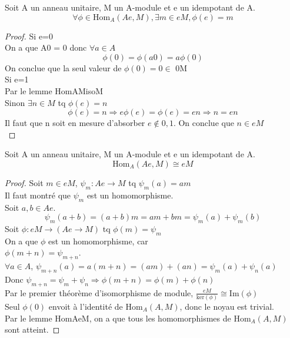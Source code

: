 \begin{lemma}[HomAeM]
    \label{HomAeM}
    Soit A un anneau unitaire, M un A-module et e un idempotant de A.
    \[ \forall \phi \in \text{Hom}_{A}(Ae,M), \exists m \in e M, \phi(e)=m\]
\end{lemma}
\begin{proof}
    Si e=0\\
    On a que A0 = {0} donc $\forall a \in A$\\
    \[ \phi(0) = \phi(a 0) = a \phi (0) \]
    On conclue que la seul valeur de $\phi(0)=0 \in$ 0M\\
    Si e=1\\
    Par le lemme HomAMisoM\\
    Sinon $\exists n \in M$ tq $\phi(e)=n$
    \[ \phi(e) = n \Rightarrow e \phi(e) = \phi(e) = e n \Rightarrow n = e n \]
    Il faut que n soit en mesure d'absorber $e \notin {0,1}$. On conclue que $n \in e M$\\
\end{proof}

\begin{lemma}[HomAeMisoeM]
    \label{HomAeMisoeM}
    Soit A un anneau unitaire, M un A-module et e un idempotant de A.
    \[ \text{Hom}_{A}(A e,M) \cong e M\]
\end{lemma}
\begin{proof}
    Soit $m \in e M$, $\psi_{m} : A e \to M$ tq $\psi_{m}(a) = a m$\\
    Il faut montré que $\psi_{m}$ est un homomorphisme.\\
    Soit $a,b \in A e$.\\
    \[ \psi_{m}(a+b) = (a+b)m = a m + b m = \psi_{m}(a) + \psi_{m}(b) \]
    Soit $\phi : e M \to (A e \to M)$ tq $\phi(m) = \psi_{m}$\\
    On a que $\phi$ est un homomorphisme, car\\
    $\phi(m+n) = \psi_{m+n}$.\\
    $\forall a \in A$, $\psi_{m+n}(a) = a (m+n) = (a m) + (a n) = \psi_{m}(a)+\psi_{n}(a)$\\
    Donc $\psi_{m+n} = \psi_{m}+\psi_{n} \Rightarrow \phi(m+n) = \phi(m)+\phi(n)$\\
    Par le premier théorème d'isomorphisme de module, $\frac{e M}{\text{ker}(\phi)} \cong \text{Im}(\phi)$\\
    Seul $\phi(0)$ envoit à l'identité de $\text{Hom}_{A}(A,M)$, donc le noyau est trivial.\\
    Par le lemme HomAeM, on a que tous les homomorphismes de $\text{Hom}_{A}(A,M)$ sont atteint.
\end{proof}